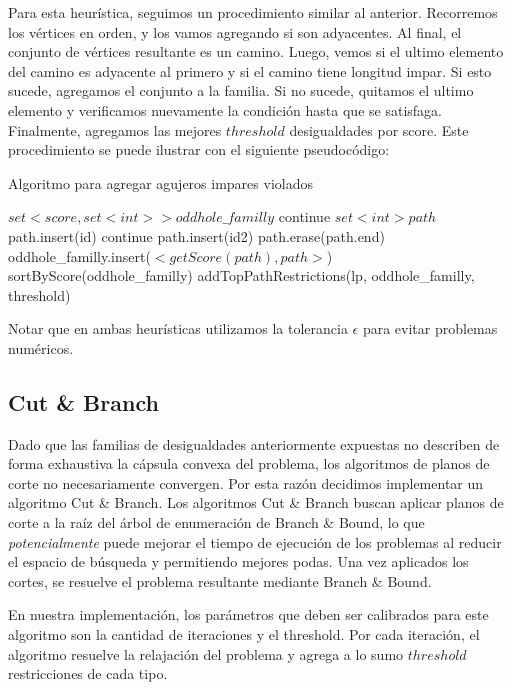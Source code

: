 Para esta heurística, seguimos un procedimiento similar al anterior. Recorremos los vértices en orden, y los vamos agregando si son adyacentes. Al final, el conjunto de vértices resultante es un camino. Luego, vemos si el ultimo elemento del camino es adyacente al primero y si el camino tiene longitud impar. Si esto sucede, agregamos el conjunto a la familia. Si no sucede, quitamos el ultimo elemento y verificamos nuevamente la condición hasta que se satisfaga. Finalmente, agregamos las mejores $threshold$ desigualdades por score. Este procedimiento se puede ilustrar con el siguiente pseudocódigo:

\begin{algorithm}
\caption{Algoritmo para agregar agujeros impares violados}
\begin{algorithmic}[1]
\State $set<score, set<int>> oddhole\_familly$
		\State continue
	\EndIf
	\State $set<int> path$
	\State path.insert(id)
			\State continue
		\EndIf
			\State path.insert(id2)
		\EndIf
	\EndFor
		\State path.erase(path.end)
	\EndWhile
		\State oddhole\_familly.insert($<getScore(path), path>$)
	\EndIf
\EndFor
\State sortByScore(oddhole\_familly)
\State addTopPathRestrictions(lp, oddhole\_familly, threshold)

\EndProcedure
\end{algorithmic}
\end{algorithm}

Notar que en ambas heurísticas utilizamos la tolerancia $\epsilon$ para evitar problemas numéricos.

\subsection{Cut \& Branch}

Dado que las familias de desigualdades anteriormente expuestas no describen de forma exhaustiva la cápsula convexa del problema, los algoritmos de planos de corte no necesariamente convergen. Por esta razón decidimos implementar un algoritmo Cut \& Branch. Los algoritmos Cut \& Branch buscan aplicar planos de corte a la raíz del árbol de enumeración de Branch \& Bound, lo que \textit{potencialmente} puede mejorar el tiempo de ejecución de los problemas al reducir el espacio de búsqueda y permitiendo mejores podas. Una vez aplicados los cortes, se resuelve el problema resultante mediante Branch \& Bound.

En nuestra implementación, los parámetros que deben ser calibrados para este algoritmo son la cantidad de iteraciones y el threshold. Por cada iteración, el algoritmo resuelve la relajación del problema y agrega a lo sumo $threshold$ restricciones de cada tipo.